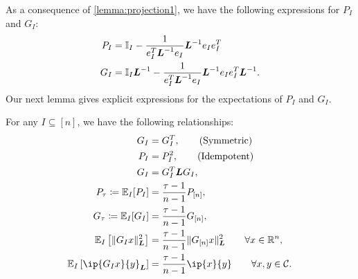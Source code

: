 As a consequence of \autoref{lemma:projection1}, we have the following expressions for $P_I$ and $G_I$:
\begin{align*}
    P_I &= \mathbb{I}_I - \frac{1}{e_I^T\boldsymbol{L} ^{-1}e_I}\boldsymbol{L}^{-1}e_Ie_I^T\\
    G_I &= \mathbb{I}_I\boldsymbol{L}^{-1} - \frac{1}{e_I^T\boldsymbol{L}^{-1}e_I}\boldsymbol{L}^{-1}e_Ie_I^T\boldsymbol{L}^{-1}.
\end{align*}
Our next lemma gives explicit expressions for the expectations of $P_I$ and $G_I$. 
\begin{lemma} \label{lemma:matrix_expectation}
    For any $I \subseteq [n]$, we have the following relationships:
    \begin{align}
        G_{I} &= G_{I}^T, \tag{Symmetric} \\
        P_{I} &= P_{I}^2, \tag{Idempotent} \\
        G_{I} &= G_{I}^T \bL G_{I}, \label{eq:GeqGTLG} \\
        P_\tau \coloneqq \mathbb{E}_I[P_I] &= \frac{\tau - 1}{n - 1} P_{[n]}, \label{eq:Pnexp} \\
        G_\tau \coloneqq \mathbb{E}_I[G_I] &= \frac{\tau - 1}{n - 1} G_{[n]}, \label{eq:Gnexp} \\
        \mE_I \left[\| G_I x \|^2_{\bL} \right] &= \frac{\tau-1}{n-1}  \| G_{[n]} x \|^2_{\bL} \qquad \forall x \in \Real^n, \label{eq:GnormExp}\\
        \mE_I \left[ \ip{G_I x}{y}_{\bL}\right] &= \frac{\tau - 1}{n - 1}\ip{x}{y} \qquad \forall x,y \in \Cscr. \label{eq:GIpExp}
    \end{align}
\end{lemma}
